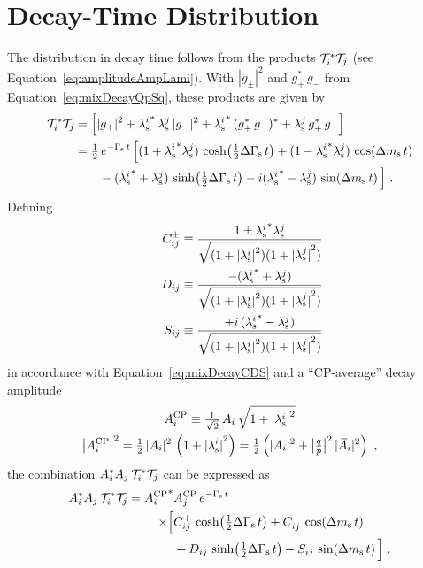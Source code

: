 \section{Decay-Time Distribution}
\label{sec:pheno_time}

The distribution in decay time follows from the products $\timeAmp^*\timeAmp[j]$ (see Equation~\ref{eq:amplitudeAmpLami}). With $|g_\pm|^2$
and $g_+^*\,g_-$ from Equation~\ref{eq:mixDecayQpSq}, these products are given by
\begin{align}
  \label{eq:timeDepProd}
  \timeAmp^*\timeAmp[j]
  &=\left[ |g_+|^2 + \lamsi^*\,\lamsi[j]\, |g_-|^2 + \lamsi^*\, (g_+^*\,g_-)^* + \lamsi[j]\, g_+^*\,g_- \right] \nonumber \\
  &=\tfrac{1}{2}\, \eGst\, \Big[    (1+\lamsi^*\lamsi[j]) \, \cDGs
                                +   (1-\lamsi^*\lamsi[j]) \, \cDms \nonumber \\
  &\quad\quad            -   (\lamsi^* + \lamsi[j])\,   \sDGs
                                - i (\lamsi^* - \lamsi[j])\,   \sDms \Big] \ .
\end{align}
Defining
\begin{equation}
  \label{eq:CDSPolarDep}
  \begin{aligned}
    \Cf[ij]^\pm    &\equiv \frac{1\pm\lamsi^*\lamsi[j]}{\sqrt{(1+\lamsiSq)(1+\lamsiSq[j])}} \\
    \qquad \Df[ij] &\equiv \frac{-    (\lamsi^* + \lamsi[j])}{\sqrt{(1+\lamsiSq)(1+\lamsiSq[j])}} \\
    \qquad \Sf[ij] &\equiv \frac{+i\, (\lamsi^* - \lamsi[j])}{\sqrt{(1+\lamsiSq)(1+\lamsiSq[j])}}
  \end{aligned}
\end{equation}
in accordance with Equation~\ref{eq:mixDecayCDS} and a ``CP-average'' decay amplitude
\begin{equation}
  \label{eq:CPAvAmp}
  \begin{gathered}
    \AAv \equiv \tfrac{1}{\sqrt{2}}\, \Ai\, \sqrt{1+\lamsiSq} \\
    \left|\AAv\right|^2
      = \tfrac{1}{2}\, |\Ai|^2\, \left(1 + \lamsiSq\right)
      = \tfrac{1}{2} \left(|\Ai|^2 + \qpAbsAlt^2\,|\Abari|^2\right) \ ,
  \end{gathered}
\end{equation}
the combination $\Ai^*\Ai[j]\,\timeAmp^*\timeAmp[j]$ can be expressed as
\begin{equation}
  \label{eq:timeDep}
  \begin{aligned}
    \Ai^*\Ai[j]\,\timeAmp^*\timeAmp[j]
      = \AAvConj&\AAv[{\Ai[j]}]\, \eGst \\
        \times\Big[ &\Cf[ij]^+\,\cDGs + \Cf[ij]^-\,\cDms \\
                    &+ \Df[ij]\,\sDGs - \Sf[ij]\,\sDms \Big] \ .
  \end{aligned}
\end{equation}

